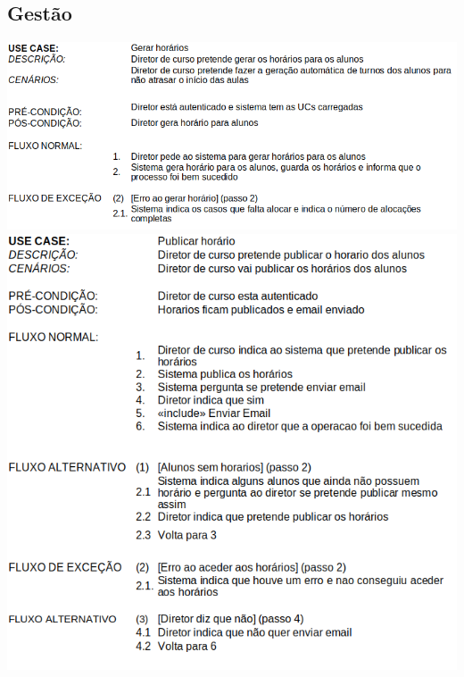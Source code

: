 \documentclass[a4paper,12pt]{article}
\begin{document}
    \subsection{Gestão}
    \includegraphics[width=\textwidth]{gerarHorarios.png}\vspace{0.5cm}
    \includegraphics[width=\textwidth]{publicarHorario.png}
    
\end{document}
